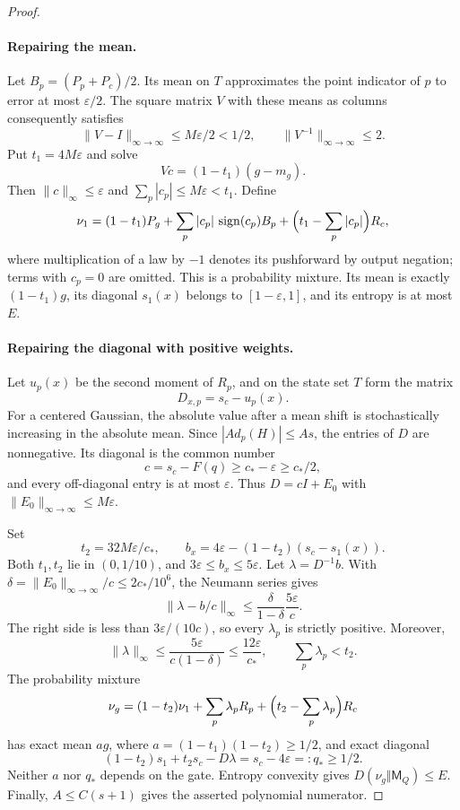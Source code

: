 \begin{proof}
\paragraph{Repairing the mean.}
Let $B_p=(P_p+P_c)/2$. Its mean on $T$ approximates the point
indicator of $p$ to error at most $\varepsilon/2$. The square
matrix $V$ with these means as columns consequently satisfies
\[
 \|V-I\|_{\infty\to\infty}\le M\varepsilon/2<1/2,
 \qquad \|V^{-1}\|_{\infty\to\infty}\le2.
\]
Put $t_1=4M\varepsilon$ and solve
\[
 Vc=(1-t_1)(g-m_g).
\]
Then $\|c\|_\infty\le\varepsilon$ and
$\sum_p|c_p|\le M\varepsilon<t_1$. Define
\[
 \nu_1=(1-t_1)P_g+
       \sum_p|c_p|\,\operatorname{sign}(c_p)B_p+
       \Bigl(t_1-\sum_p|c_p|\Bigr)R_c,
\]
where multiplication of a law by $-1$ denotes its pushforward by
output negation; terms with $c_p=0$ are omitted. This is a probability
mixture. Its mean is exactly $(1-t_1)g$, its diagonal $s_1(x)$
belongs to $[1-\varepsilon,1]$, and its entropy is at most $E$.

\paragraph{Repairing the diagonal with positive weights.}
Let $u_p(x)$ be the second moment of $R_p$, and on the state set
$T$ form the matrix
\[
 D_{x,p}=s_c-u_p(x).
\]
For a centered Gaussian, the absolute value after a mean shift is
stochastically increasing in the absolute mean. Since
$|Ad_p(H)|\le As$, the entries of $D$ are nonnegative. Its diagonal
is the common number
\[
 c=s_c-F(q)\ge c_*-\varepsilon\ge c_*/2,
\]
and every off-diagonal entry is at most $\varepsilon$. Thus
$D=cI+E_0$ with $\|E_0\|_{\infty\to\infty}\le M\varepsilon$.

Set
\[
 t_2=32M\varepsilon/c_*,\qquad
 b_x=4\varepsilon-(1-t_2)(s_c-s_1(x)).
\]
Both $t_1,t_2$ lie in $(0,1/10)$, and
$3\varepsilon\le b_x\le5\varepsilon$. Let $\lambda=D^{-1}b$.
With $\delta=\|E_0\|_{\infty\to\infty}/c\le2c_*/10^6$,
the Neumann series gives
\[
 \|\lambda-b/c\|_\infty
 \le\frac{\delta}{1-\delta}\frac{5\varepsilon}{c}.
\]
The right side is less than $3\varepsilon/(10c)$, so every
$\lambda_p$ is strictly positive. Moreover,
\[
 \|\lambda\|_\infty
 \le\frac{5\varepsilon}{c(1-\delta)}
 \le\frac{12\varepsilon}{c_*},\qquad
 \sum_p\lambda_p<t_2.
\]
The probability mixture
\[
 \nu_g=(1-t_2)\nu_1+\sum_p\lambda_p R_p+
              \Bigl(t_2-\sum_p\lambda_p\Bigr)R_c
\]
has exact mean $ag$, where
$a=(1-t_1)(1-t_2)\ge1/2$, and exact diagonal
\[
 (1-t_2)s_1+t_2s_c-D\lambda=s_c-4\varepsilon=:q_*\ge1/2.
\]
Neither $a$ nor $q_*$ depends on the gate. Entropy convexity gives
$D(\nu_g\Vert\mathsf M_Q)\le E$. Finally,
$A\le C(s+1)$ gives the asserted polynomial numerator.
\end{proof}
